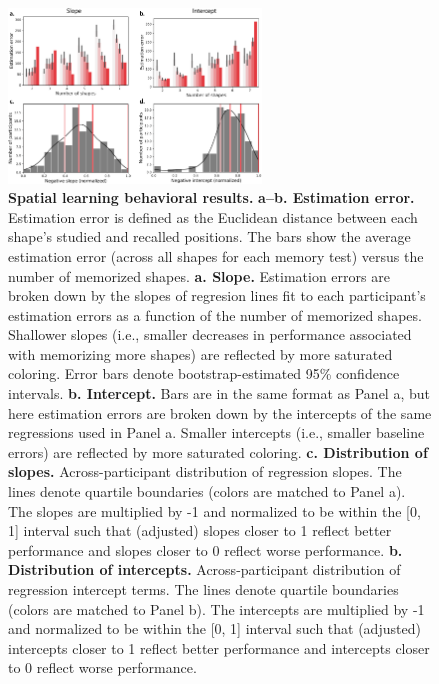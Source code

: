 \documentclass[10pt]{article}
\begin{document}
\begin{figure}[p]
\centering
\includegraphics[width=0.6\textwidth]{figs/spatial_learning_behavior}
\caption{\textbf{Spatial learning behavioral results.}
  \textbf{a--b. Estimation error.}  Estimation
  error is defined as the Euclidean distance between each shape's
  studied and recalled positions.  The bars show the average
  estimation error (across all shapes for each memory test) versus the
  number of memorized shapes.  \textbf{a. Slope.} Estimation errors
  are broken down by the slopes of regresion lines fit to each
  participant's estimation errors as a function of the number of
  memorized shapes.  Shallower slopes (i.e., smaller decreases in
  performance associated with memorizing more shapes) are reflected by
  more saturated coloring.  Error bars denote bootstrap-estimated 95\%
  confidence intervals.  \textbf{b. Intercept.}  Bars are in the same
  format as Panel a, but here estimation errors are
  broken down by the intercepts of the same regressions used in Panel
  a.  Smaller intercepts (i.e., smaller baseline errors) are reflected
  by more saturated coloring.  \textbf{c. Distribution of slopes.}
  Across-participant distribution of regression slopes.  The lines
  denote quartile boundaries (colors are matched to Panel a).  The
  slopes are multiplied by -1 and normalized to be within the [0, 1]
  interval such that (adjusted) slopes closer to 1 reflect better
  performance and slopes closer to 0 reflect worse performance.
  \textbf{b. Distribution of intercepts.}  Across-participant
  distribution of regression intercept terms.  The lines denote
  quartile boundaries (colors are matched to Panel b).  The intercepts
  are multiplied by -1 and normalized to be within the [0, 1] interval
  such that (adjusted) intercepts closer to 1 reflect better
  performance and intercepts closer to 0 reflect worse performance.}
\label{fig:spatial_behavioral}
\end{figure}
\end{document}
